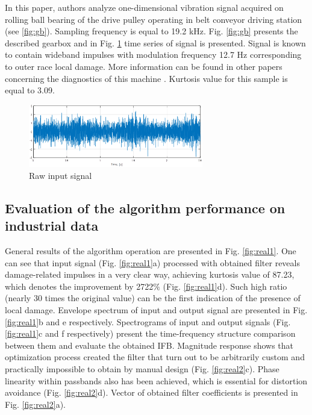 \documentclass[preprint,12pt]{elsarticle}
\begin{document}
In this paper, authors analyze one-dimensional vibration signal acquired on rolling ball bearing of the drive pulley operating in belt conveyor driving station (see \ref{fig:gb}). Sampling frequency is equal to 19.2 kHz. Fig. \ref{fig:gb} presents the described gearbox and in Fig. \ref{fig:raw} time series of signal is presented. Signal is known to contain wideband impulses with modulation frequency 12.7 Hz corresponding to outer race local damage. More information can be found in other papers concerning the diagnostics of this machine \cite{zimroz2009some}. Kurtosis value for this sample is equal to 3.09.

\begin{figure}[ht!]
\centering
\includegraphics[width=0.68\textwidth]{wykresy/raw.png}
\caption{Raw input signal}
\label{fig:raw}
\end{figure}

\subsection{Evaluation of the algorithm performance on industrial data}



General results of the algorithm operation are presented in Fig. \ref{fig:real1}. One can see that input signal (Fig. \ref{fig:real1}a) processed with obtained filter reveals damage-related impulses in a very clear way, achieving kurtosis value of 87.23, which denotes the improvement by 2722$\%$ (Fig. \ref{fig:real1}d). Such high ratio (nearly 30 times the original value) can be the first indication of the presence of local damage. Envelope spectrum of input and output signal are presented in Fig. \ref{fig:real1}b and e respectively. Spectrograms of input and output signals (Fig. \ref{fig:real1}c and f respectively) present the time-frequency structure comparison between them and evaluate the obtained IFB. Magnitude response shows that optimization process created the filter that turn out to be arbitrarily custom and practically impossible to obtain by manual design (Fig. \ref{fig:real2}c). Phase linearity within passbands also has been achieved, which is essential for distortion avoidance (Fig. \ref{fig:real2}d). Vector of obtained filter coefficients is presented in Fig. \ref{fig:real2}a). 
\end{document}
